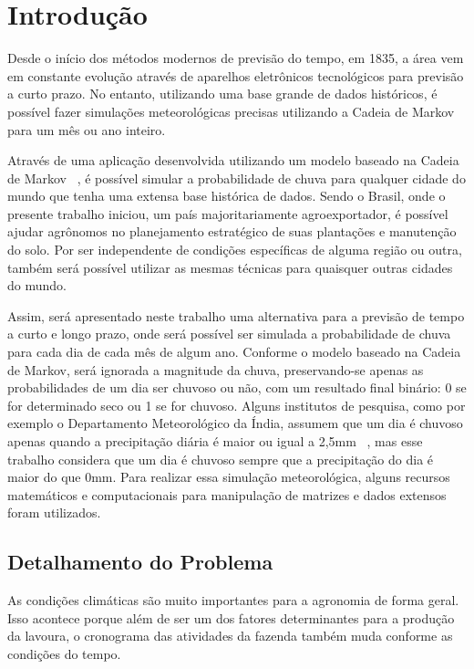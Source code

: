 \chapter{Introdução}
\label{c.introducao}

Desde o início dos métodos modernos de previsão do tempo, em 1835, a área vem em 
constante evolução através de aparelhos eletrônicos tecnológicos para previsão a curto prazo. No entanto, utilizando uma base grande de dados históricos, é possível fazer simulações meteorológicas precisas utilizando a Cadeia de Markov para um mês ou ano inteiro.

Através de uma aplicação desenvolvida utilizando um modelo baseado na Cadeia de 
Markov ~\cite{artigo_modelo}, é possível simular a probabilidade de chuva para qualquer cidade do mundo que tenha uma extensa base histórica de dados.
Sendo o Brasil, onde o presente trabalho iniciou, um país majoritariamente agroexportador, é possível ajudar agrônomos no planejamento estratégico de suas plantações e manutenção do solo. Por ser independente de condições específicas de alguma região ou outra, também será possível utilizar as mesmas técnicas para quaisquer outras cidades do mundo.

Assim, será apresentado neste trabalho uma alternativa para a previsão de tempo a curto e longo prazo, onde será possível ser simulada a probabilidade de chuva para cada dia de cada mês de algum ano. Conforme o modelo baseado na Cadeia de Markov, será ignorada a magnitude da chuva, preservando-se apenas as probabilidades de um dia ser chuvoso ou não, com um resultado final binário: 0 se for determinado seco ou 1 se for chuvoso. Alguns institutos de pesquisa, como por exemplo o Departamento Meteorológico da Índia, assumem que um dia é chuvoso apenas quando a precipitação diária é maior ou igual a 2,5mm ~\cite{imd_rainfall}, mas esse trabalho considera que um dia é chuvoso sempre que a precipitação do dia é maior do que 0mm. Para realizar essa simulação meteorológica, alguns recursos matemáticos e computacionais para manipulação de matrizes e dados extensos foram utilizados.

\section{Detalhamento do Problema}
\label{s.detalhamento}

As condições climáticas são muito importantes para a agronomia de forma geral. Isso acontece porque além de ser um dos fatores determinantes para a produção da lavoura, o cronograma das atividades da fazenda também muda conforme as condições do tempo.

